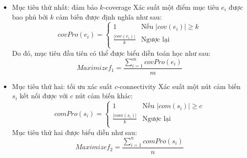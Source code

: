\documentclass{article}
\begin{document}
\begin{itemize}
    \item Mục tiêu thứ nhất: đảm bảo $k$-coverage
    \newline Xác suất một điểm mục tiêu $e_i$ được bao phủ bởi $k$ cảm biến được định nghĩa như sau:
    \begin{equation}
        covPro(e_i) = 
        \begin{cases}
            1 & \text{Nếu } |cov(e_i)| \geq k \\
            \frac{|cov(e_i)|}{k} & \text{Ngược lại}\\
        \end{cases}
    \end{equation}
    Do đó, mục tiêu đầu tiên có thể được biểu diễn toán học như sau:
    $$ Maximize f_1 = \frac{\sum_{i=1}^{m}covPro(e_i)}{m} $$
    
    \item Mục tiêu thứ hai: tối ưu xác suất $c$-connectivity
    \newline Xác suất một nút cảm biến $s_i$ kết nối được với $c$  nút cảm biến khác:
    \begin{equation}
        comPro(s_i) = 
        \begin{cases}
            1 & \text{Nếu } |com(s_i)| \geq c \\
            \frac{|com(s_i)|}{k} & \text{Ngược lại}\\
        \end{cases}
    \end{equation}
    Mục tiêu thứ hai được biểu diễn như sau:
    $$ Maximize f_2 = \frac{\sum_{i=1}^{n}comPro(s_i)}{n}$$
    

\end{itemize}
\end{document}
